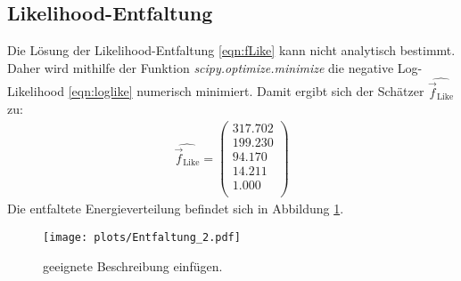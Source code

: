 \subsection{Likelihood-Entfaltung}
Die Lösung der Likelihood-Entfaltung \eqref{eqn:fLike} kann nicht analytisch bestimmt. Daher wird mithilfe der Funktion \textit{scipy.optimize.minimize} die negative Log-Likelihood \eqref{eqn:loglike} numerisch minimiert. Damit ergibt sich der Schätzer $\hat{\vec{f}_{\text{Like}}}$ zu:\\
\begin{align*}
	\hat{\vec{f}_{\text{Like}}} = \begin{pmatrix}
			317.702\\
			199.230\\
			94.170\\
			14.211\\
			1.000\\
	\end{pmatrix}
\end{align*}
Die entfaltete Energieverteilung befindet sich in Abbildung \ref{fig:E2}.
\begin{figure}
  \centering
  \texttt{[image: plots/Entfaltung\_2.pdf]}
  \caption{geeignete Beschreibung einfügen.}
  \label{fig:E2}
\end{figure}
